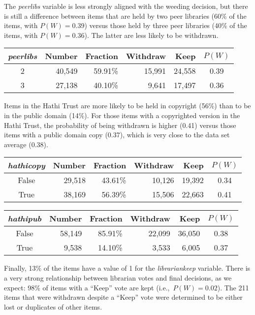 \documentclass[man,11pt]{apa6}
\begin{document}
The {\em peerlibs} variable is less strongly aligned with the weeding
decision, but there is still a difference between items that are held
by two peer libraries (60\% of the items, with $P(W) = 0.39$) versus
those held by three peer libraries (40\% of the items, with $P(W) =
0.36$).  The latter are less likely to be withdrawn.

\singlespacing
\begin{center}
\begin{tabular}{|c|rr|rr|c|}
\hline
{\em peerlibs} & Number & Fraction & Withdraw & Keep & $P(W)$\\ \hline
2 & 40,549 & 59.91\% & 15,991 & 24,558 & 0.39 \\
3 & 27,138 & 40.10\% &  9,641 & 17,497 & 0.36 \\
\hline
\end{tabular}
\end{center}
\doublespacing

Items in the Hathi Trust are more likely to be held in copyright
(56\%) than to be in the public domain (14\%).  For those items with a
copyrighted version in the Hathi Trust, the probability of being
withdrawn is higher (0.41) versus those items with a public domain
copy (0.37), which is very close to the data set average (0.38). 

\singlespacing
\begin{center}
\begin{tabular}{|c|rr|rr|c|}
\hline
{\em hathicopy} & Number & Fraction & Withdraw & Keep & $P(W)$\\ \hline
False & 29,518 & 43.61\% & 10,126 & 19,392 & 0.34 \\
True  & 38,169 & 56.39\% & 15,506 & 22,663 & 0.41 \\
\hline
\end{tabular}
\end{center}
\doublespacing

\singlespacing
\begin{center}
\begin{tabular}{|c|rr|rr|c|}
\hline
{\em hathipub} & Number & Fraction & Withdraw & Keep & $P(W)$\\ \hline
False & 58,149 & 85.91\% & 22,099 & 36,050 & 0.38 \\
True  &  9,538 & 14.10\% &  3,533 &  6,005 & 0.37 \\
\hline
\end{tabular}
\end{center}
\doublespacing

Finally, 13\% of the items have a value of 1 for the {\em
  librariankeep} variable.  There is a very strong relationship
between librarian votes and final decisions, as we expect: 98\% of
items with a ``Keep'' vote are kept (i.e.,~$P(W) = 0.02$).  The 211
items that were withdrawn despite a ``Keep'' vote were determined to
be either lost or duplicates of other items.
\end{document}

